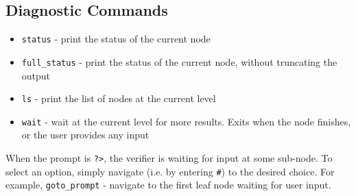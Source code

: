 \subsection{Diagnostic Commands}

\begin{itemize}
\item \texttt{status} - print the status of the current node
\item \texttt{full\_status} - print the status of the current node, without truncating the output
\item \texttt{ls} - print the list of nodes at the current level
\item \texttt{wait} - wait at the current level for more results. Exits when the node finishes, or
the user provides any input
\end{itemize}
When the prompt is \texttt{?>}, the verifier is waiting for input at some sub-node.
To select an option, simply navigate (i.e. by entering \texttt{\#}) to the desired choice.
For example, \texttt{goto\_prompt} - navigate to the first leaf node waiting for user input.


